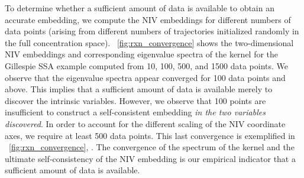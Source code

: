 To determine whether a sufficient amount of data is available to obtain an accurate embedding, we compute the NIV embeddings for different numbers of data points
(arising from different numbers of trajectories initialized randomly in the full concentration space).
%
\fig~\ref{fig:rxn_convergence} shows the two-dimensional NIV embeddings and corresponding eigenvalue spectra of the kernel for the Gillespie SSA example computed from 10, 100, 500, and 1500 data points.
%
We observe that the eigenvalue spectra appear converged for 100 data points and above.
%
This implies that a sufficient amount of data is available merely to discover the intrinsic variables.
%
However, we observe that 100 points are insufficient to construct a self-consistent embedding {\em in the two variables discovered}.
%
In order to account for the different scaling of the NIV coordinate axes, we require at least 500 data points.
%
This last convergence is exemplified in \fig~\ref{fig:rxn_convergence}, .
%
The convergence of the spectrum of the kernel and the ultimate self-consistency of the NIV embedding is our empirical indicator that a sufficient amount of data is available.
